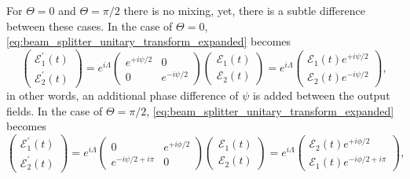 For $\Theta=0$ and $\Theta=\pi/2$ there is no mixing, yet, there is a subtle difference between these cases.
In the case of $\Theta=0$, \cref{eq:beam_splitter_unitary_transform_expanded} becomes
\begin{equation}
    \begin{pmatrix}
        \mathcal{E}_1^\prime(t)
        \\
        \mathcal{E}_2^\prime(t)
    \end{pmatrix}
    =
    e^{i\Lambda}
    \begin{pmatrix}
        e^{+i\psi/2} & 0
        \\
        0 & e^{-i\psi/2}
    \end{pmatrix}
    \begin{pmatrix}
        \mathcal{E}_1(t)
        \\
        \mathcal{E}_2(t)
    \end{pmatrix}
    =
    e^{i\Lambda}
    \begin{pmatrix}
        \mathcal{E}_1(t)e^{+i\psi/2}
        \\
        \mathcal{E}_2(t)e^{-i\psi/2}
    \end{pmatrix}
    \label{eq:beam_splitter_unitary_transform_transmission},
\end{equation}
in other words, an additional phase difference of $\psi$ is added between the output fields.
In the case of $\Theta=\pi/2$, \cref{eq:beam_splitter_unitary_transform_expanded} becomes
\begin{equation}
    \begin{pmatrix}
        \mathcal{E}_1^\prime(t)
        \\
        \mathcal{E}_2^\prime(t)
    \end{pmatrix}
    =
    e^{i\Lambda}
    \begin{pmatrix}
        0 & e^{+i\phi/2}
        \\
        e^{-i\psi/2+i\pi} & 0
    \end{pmatrix}
    \begin{pmatrix}
        \mathcal{E}_1(t)
        \\
        \mathcal{E}_2(t)
    \end{pmatrix}
    =
    e^{i\Lambda}
    \begin{pmatrix}
        \mathcal{E}_2(t)e^{+i\phi/2}
        \\
        \mathcal{E}_1(t)e^{-i\phi/2+i\pi}
    \end{pmatrix}
    \label{eq:beam_splitter_unitary_transform_reflection},
\end{equation}
